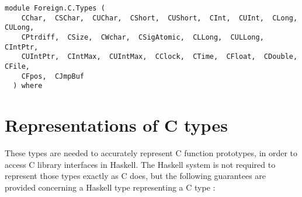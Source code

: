 \label{module:Foreign.C.Types}
\haddockbeginheader
{\haddockverb\begin{verbatim}
module Foreign.C.Types (
    CChar,  CSChar,  CUChar,  CShort,  CUShort,  CInt,  CUInt,  CLong,  CULong, 
    CPtrdiff,  CSize,  CWchar,  CSigAtomic,  CLLong,  CULLong,  CIntPtr, 
    CUIntPtr,  CIntMax,  CUIntMax,  CClock,  CTime,  CFloat,  CDouble,  CFile, 
    CFpos,  CJmpBuf
  ) where\end{verbatim}}
\haddockendheader

\section{Representations of C types
}
These types are needed to accurately represent C function prototypes,
in order to access C library interfaces in Haskell.  The Haskell system
is not required to represent those types exactly as C does, but the
following guarantees are provided concerning a Haskell type 
representing a C type :
\par
